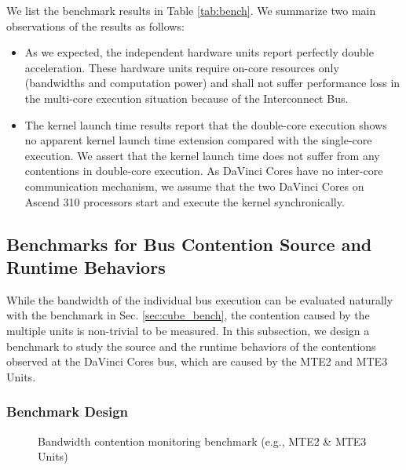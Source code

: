 We list the benchmark results in Table \ref{tab:bench}. We summarize two main observations of the results as follows:

\begin{itemize}
    \item As we expected, the independent hardware units report perfectly double acceleration. These hardware units require on-core resources only (bandwidths and computation power) and shall not suffer performance loss in the multi-core execution situation because of the Interconnect Bus.
    
    \item The kernel launch time results report that the double-core execution shows no apparent kernel launch time extension compared with the single-core execution. We assert that the kernel launch time does not suffer from any contentions in double-core execution. As DaVinci Cores have no inter-core communication mechanism, we assume that the two DaVinci Cores on Ascend 310 processors start and execute the kernel synchronically.
\end{itemize}


\subsection{Benchmarks for Bus Contention Source and Runtime Behaviors}

While the bandwidth of the individual bus execution can be evaluated naturally with the benchmark in Sec. \ref{sec:cube_bench}, the contention caused by the multiple units is non-trivial to be measured. In this subsection, we design a benchmark to study the source and the runtime behaviors of the contentions observed at the DaVinci Cores bus, which are caused by the MTE2 and MTE3 Units. 

\subsubsection{Benchmark Design \label{sec:ben_des}}

\begin{figure}[tbp]
    \caption{Bandwidth contention monitoring benchmark (e.g., MTE2 \& MTE3 Units)}
    \label{fig:bench_meth}
    \end{figure}


